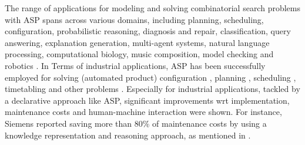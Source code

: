 \documentclass{easychair}
\newcommand{\ASP}{ASP}
\begin{document}
  The range of applications for modeling and solving combinatorial search problems with \ASP{} spans across various domains, including planning, scheduling, configuration, probabilistic reasoning, diagnosis and repair, classification, query answering, explanation generation, multi-agent systems, natural language processing, computational biology, music composition, model checking and robotics \cite{ergele16}. 
  In Terms of industrial applications, \ASP{} has been successfully employed for solving (automated product) configuration \cite{soinie99a, hebasasc22a}, planning \cite{jizhkhst19a, sopobasc23a}, scheduling \cite{aldoma17a}, timetabling \cite{bainkaokscsotawa18a} and other problems \cite{fafrsctate18a}. 
  Especially for industrial applications, tackled by a declarative approach like \ASP{}, significant improvements wrt implementation, maintenance costs and human-machine interaction were shown. 
  For instance, Siemens reported saving more than 80\% of maintenance costs by using a knowledge representation and reasoning approach, as mentioned in \cite{fafrhascsc16a}. 
\end{document}
